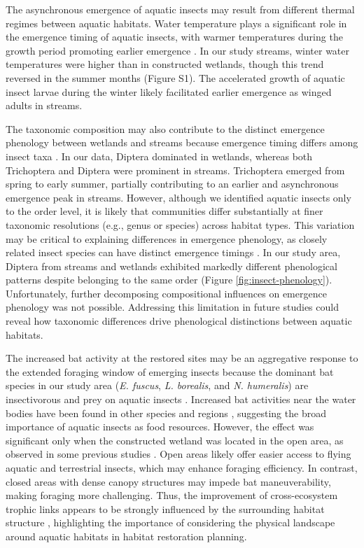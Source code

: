 \documentclass[11pt, class=article, crop=false]{standalone}
\begin{document}
The asynchronous emergence of aquatic insects may result from different thermal regimes between aquatic habitats.
Water temperature plays a significant role in the emergence timing of aquatic insects, with warmer temperatures during the growth period promoting earlier emergence \citep{woods_phenology_2022}.
In our study streams, winter water temperatures were higher than in constructed wetlands, though this trend reversed in the summer months (Figure S1).
The accelerated growth of aquatic insect larvae during the winter likely facilitated earlier emergence as winged adults in streams.

The taxonomic composition may also contribute to the distinct emergence phenology between wetlands and streams because emergence timing differs among insect taxa \citep{terui_species-specific_2017, moore_spawning_2010}.
In our data, Diptera dominated in wetlands, whereas both Trichoptera and Diptera were prominent in streams.
Trichoptera emerged from spring to early summer, partially contributing to an earlier and asynchronous emergence peak in streams.
However, although we identified aquatic insects only to the order level, it is likely that communities differ substantially at finer taxonomic resolutions (e.g., genus or species) across habitat types.
This variation may be critical to explaining differences in emergence phenology, as closely related insect species can have distinct emergence timings \citep{moore_spawning_2010}.
In our study area, Diptera from streams and wetlands exhibited markedly different phenological patterns despite belonging to the same order (Figure \ref{fig:insect-phenology}).
Unfortunately, further decomposing compositional influences on emergence phenology was not possible.
Addressing this limitation in future studies could reveal how taxonomic differences drive phenological distinctions between aquatic habitats.

The increased bat activity at the restored sites may be an aggregative response to the extended foraging window of emerging insects because the dominant bat species in our study area (\textit{E. fuscus}, \textit{L. borealis}, and \textit{N. humeralis}) are insectivorous and prey on aquatic insects \citep{whitaker_food_1992, clare_species_2009, agosta_habitat_2002}.
Increased bat activities near the water bodies have been found in other species and regions \citep{akasaka_influence_2009, stahlschmidt_constructed_2012, sirami_artificial_2013}, suggesting the broad importance of aquatic insects as food resources.
However, the effect was significant only when the constructed wetland was located in the open area, as observed in some previous studies \citep{stahlschmidt_constructed_2012, sirami_artificial_2013}.
Open areas likely offer easier access to flying aquatic and terrestrial insects, which may enhance foraging efficiency.
In contrast, closed areas with dense canopy structures may impede bat maneuverability, making foraging more challenging.
Thus, the improvement of cross-ecosystem trophic links appears to be strongly influenced by the surrounding habitat structure \citep{marczak_meta-analysis_2007}, highlighting the importance of considering the physical landscape around aquatic habitats in habitat restoration planning.
\end{document}
